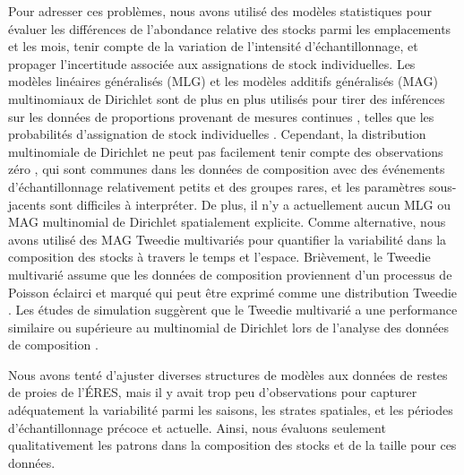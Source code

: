 Pour adresser ces problèmes, nous avons utilisé des modèles statistiques pour évaluer les différences de l'abondance relative des stocks parmi les emplacements et les mois, tenir compte de la variation de l'intensité d'échantillonnage, et propager l'incertitude associée aux assignations de stock individuelles. Les modèles linéaires généralisés (MLG) et les modèles additifs généralisés (MAG) multinomiaux de Dirichlet sont de plus en plus utilisés pour tirer des inférences sur les données de proportions provenant de mesures continues \citep{doumaAnalysingContinuousProportions2019}, telles que les probabilités d'assignation de stock individuelles \citep{freshwaterIntegratedModelSeasonal2021, jensenIntroducingZoidMixture2022}. Cependant, la distribution multinomiale de Dirichlet ne peut pas facilement tenir compte des observations zéro \citep{doumaAnalysingContinuousProportions2019, jensenIntroducingZoidMixture2022}, qui sont communes dans les données de composition avec des événements d'échantillonnage relativement petits et des groupes rares, et les paramètres sous-jacents sont difficiles à interpréter. De plus, il n'y a actuellement aucun MLG ou MAG multinomial de Dirichlet spatialement explicite. Comme alternative, nous avons utilisé des MAG Tweedie multivariés pour quantifier la variabilité dans la composition des stocks à travers le temps et l'espace. Brièvement, le Tweedie multivarié assume que les données de composition proviennent d'un processus de Poisson éclairci et marqué qui peut être exprimé comme une distribution Tweedie \citep{fosterPoissonGammaModel2013, thorsonDietAnalysisUsing2022}. Les études de simulation suggèrent que le Tweedie multivarié a une performance similaire ou supérieure au multinomial de Dirichlet lors de l'analyse des données de composition \citep{thorsonMultivariateTweedieSelfweightingLikelihood2023}.

Nous avons tenté d'ajuster diverses structures de modèles aux données de restes de proies de l'ÉRES, mais il y avait trop peu d'observations pour capturer adéquatement la variabilité parmi les saisons, les strates spatiales, et les périodes d'échantillonnage précoce et actuelle. Ainsi, nous évaluons seulement qualitativement les patrons dans la composition des stocks et de la taille pour ces données.

